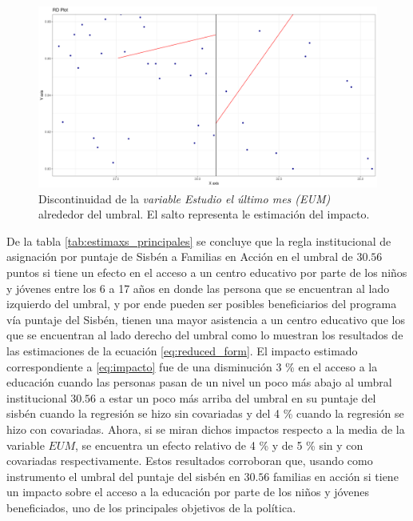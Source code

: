 \documentclass[AER]{AEA}
\begin{document}
\begin{figure}[h!]
    \centering
    \includegraphics[scale = 0.35]{imagenes/estimax_principal/main_estimax_interes.png}
    \caption{Discontinuidad de la \textit{variable Estudio el último mes (EUM)} alrededor del umbral. El salto representa le estimación del impacto.}
    \label{fig:main_estimax_interes}
\end{figure}


De la tabla \ref{tab:estimaxs_principales} se concluye que la regla institucional de asignación por puntaje de Sisbén a Familias en Acción en el umbral de $30.56$ puntos si tiene un efecto en el acceso a un centro educativo por parte de los niños y jóvenes entre los 6 a 17 años en donde las persona que se encuentran al lado izquierdo del umbral, y por ende pueden ser posibles beneficiarios del programa vía puntaje del Sisbén, tienen una mayor asistencia a un centro educativo que los que se encuentran al lado derecho del umbral como lo muestran los resultados de las estimaciones de la ecuación \ref{eq:reduced_form}. El impacto estimado correspondiente a \ref{eq:impacto} fue de una disminución 3 \% en el acceso a la educación cuando las personas pasan de un nivel un poco más abajo al umbral institucional $30.56$ a estar un poco más arriba del umbral en su puntaje del sisbén cuando la regresión se hizo sin covariadas y del 4 \% cuando la regresión se hizo con covariadas. Ahora, si se miran dichos impactos respecto a la media de la variable $EUM$, se encuentra un efecto relativo de 4 \% y de 5 \%  sin y con covariadas respectivamente. Estos resultados corroboran que, usando como instrumento el umbral del puntaje del sisbén en $30.56$ familias en acción si tiene un impacto sobre el acceso a la educación por parte de los niños y jóvenes beneficiados, uno de los principales objetivos de la política. 
\end{document}
